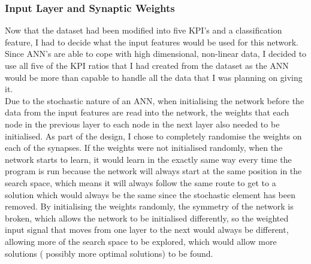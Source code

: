 \documentclass[11pt]{article}
\begin{document}
\subsubsection{Input Layer and Synaptic Weights}
Now that the dataset had been modified into five KPI's and a classification feature, I had to decide what the input features would be used for this network. Since ANN's are able to cope with high dimensional, non-linear data, I decided to use all five of the KPI ratios that I had created from the dataset as the ANN would be more than capable to handle all the data that I was planning on giving it.\\
Due to the stochastic nature of an ANN, when initialising the network before the data from the input features are read into the network, the weights that each node in the previous layer to each node in the next layer also needed to be initialised. As part of the design, I chose to completely randomise the weights on each of the synapses. If the weights were not initialised randomly, when the network starts to learn, it would learn in the exactly same way every time the program is run because the network will always start at the same position in the search space, which means it will always follow the same route to get to a solution which would always be the same since the stochastic element has been removed.  By initialising the weights randomly, the symmetry of the network is broken, which allows the network to be initialised differently, so the weighted input signal that moves from one layer to the next would always be different, allowing more of the search space to be explored, which would allow more solutions ( possibly more optimal solutions) to be found. 
\end{document}
